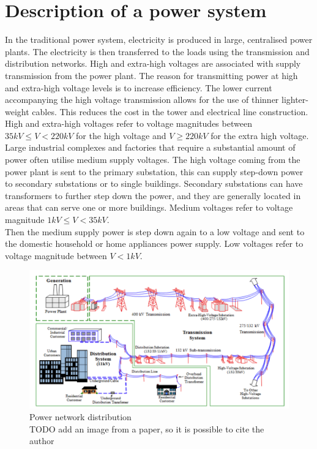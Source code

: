 \section{Description of a power system}
In the traditional power system, electricity is produced in large, centralised power plants. The
electricity is then transferred to the loads using the transmission and distribution networks.
High and extra-high voltages are associated with supply transmission from the power plant. The reason for transmitting power at high and extra-high voltage levels is to increase efficiency. The lower current accompanying the high voltage transmission allows for the use of thinner lighter-weight cables. This reduces the cost in the tower and electrical line construction. High and extra-high voltages refer to voltage magnitudes between $35 kV \leq V < 220 kV$ for the high voltage and $V \geq 220 kV$ for the extra high voltage. \\
Large industrial complexes and factories that require a substantial amount of power often utilise medium supply voltages. The high voltage coming from the power plant is sent to the primary substation, this can supply step-down power to secondary substations or to single buildings. Secondary substations can have transformers to further step down the power, and they are generally located in areas that can serve one or more buildings. Medium voltages refer to voltage magnitude $1 kV \leq V < 35 kV$. \\
Then the medium supply power is step down again to a low voltage and sent to the domestic household or home appliances power supply. Low voltages refer to voltage magnitude between $V < 1 kV$. \\
\begin{figure}[h]
\centering
    \includegraphics[width=.9\linewidth]{images/HighMediumLowV.png}
\caption[Power network distribution]{Power network distribution \\
    TODO add an image from a paper, so it is possible to cite the author}
\end{figure}


